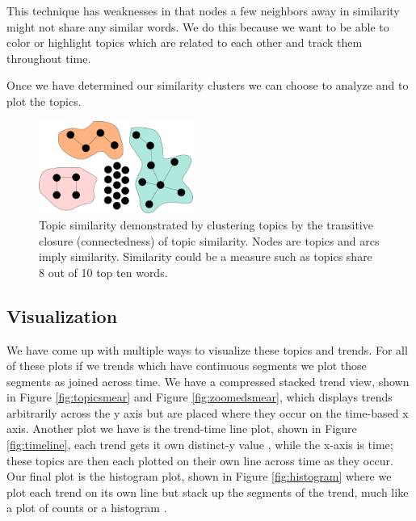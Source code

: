 \documentclass[times, 10pt,twocolumn]{article}
\begin{document}
This technique has weaknesses in that nodes a few neighbors away in
similarity might not share any similar words.  We do this because we
want to be able to color or highlight topics which are related to each
other and track them throughout time.

Once we have determined our similarity clusters we can choose to
analyze and to plot the topics.

\begin{figure}
  \centering
  \includegraphics[width=0.45\textwidth]{transitiveclosure}
  \caption{Topic similarity demonstrated by clustering topics by the transitive closure (connectedness)
    of topic similarity. Nodes are topics and
    arcs imply similarity. Similarity could be a measure such as
    topics share 8 out of 10 top ten words.}
\label{fig:closure}
\end{figure}



\subsection{Visualization}

We have come up with multiple ways to visualize these topics and
trends.  For all of these plots if we trends which have continuous
segments we plot those segments as joined across time.  We have a
compressed stacked trend view, shown in Figure \ref{fig:topicsmear}
and Figure \ref{fig:zoomedsmear}, which displays trends arbitrarily
across the y axis but are placed where they occur on the time-based x
axis. Another plot we have is the trend-time line plot, shown in
Figure \ref{fig:timeline}, each trend gets it own distinct-y value ,
while the x-axis is time; these topics are then each plotted on their
own line across time as they occur. Our final plot is the histogram
plot, shown in Figure \ref{fig:histogram} where we plot each trend on
its own line but stack up the segments of the trend, much like a plot
of counts or a histogram .
\end{document}
